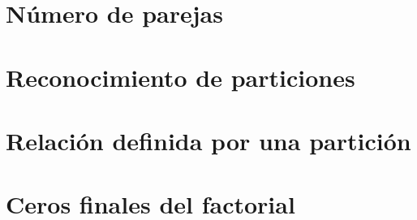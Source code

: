 \documentclass[a4paper,12pt,twoside]{book}
\begin{document}
\chapter{Número de parejas}

\chapter{Reconocimiento de particiones}

\chapter{Relación definida por una partición}

\chapter{Ceros finales del factorial}

 
% 
% 
% 
% 
%
\end{document}
